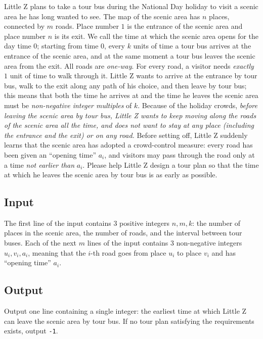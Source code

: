 \documentclass[11pt]{article}
\begin{document}
Little Z plans to take a tour bus during the National Day holiday to visit a
scenic area he has long wanted to see.
The map of the scenic area has $n$ places, connected by $m$ roads.
Place number $1$ is the entrance of the scenic area and place number $n$ is
its exit.
We call the time at which the scenic area opens for the day time $0$;
starting from time $0$, every $k$ units of time a tour bus arrives at the
entrance of the scenic area, and at the same moment a tour bus leaves the
scenic area from the exit.
All roads are \emph{one-way}.
For every road, a visitor needs \emph{exactly} $1$ unit of time to walk
through it.
Little Z wants to arrive at the entrance by tour bus, walk to the exit along
any path of his choice, and then leave by tour bus;
this means that both the time he arrives at and the time he leaves the scenic
area must be \emph{non-negative integer multiples} of $k$.
Because of the holiday crowds, \emph{before leaving the scenic area by tour
bus, Little Z wants to keep moving along the roads of the scenic area all the
time, and does not want to stay at any place (including the entrance and the
exit) or on any road.}
Before setting off, Little Z suddenly learns that the scenic area has adopted
a crowd-control measure: every road has been given an ``opening time'' $a_i$,
and visitors may pass through the road only at a time \emph{not earlier than}
$a_i$.
Please help Little Z design a tour plan so that the time at which he leaves
the scenic area by tour bus is as early as possible.

\subsection*{Input}

The first line of the input contains $3$ positive integers $n, m, k$:
the number of places in the scenic area, the number of roads, and the
interval between tour buses.
Each of the next $m$ lines of the input contains $3$ non-negative integers
$u_i, v_i, a_i$, meaning that the $i$-th road goes from place $u_i$ to place
$v_i$ and has ``opening time'' $a_i$.

\subsection*{Output}

Output one line containing a single integer: the earliest time at which
Little Z can leave the scenic area by tour bus.
If no tour plan satisfying the requirements exists, output \texttt{-1}.
\end{document}

